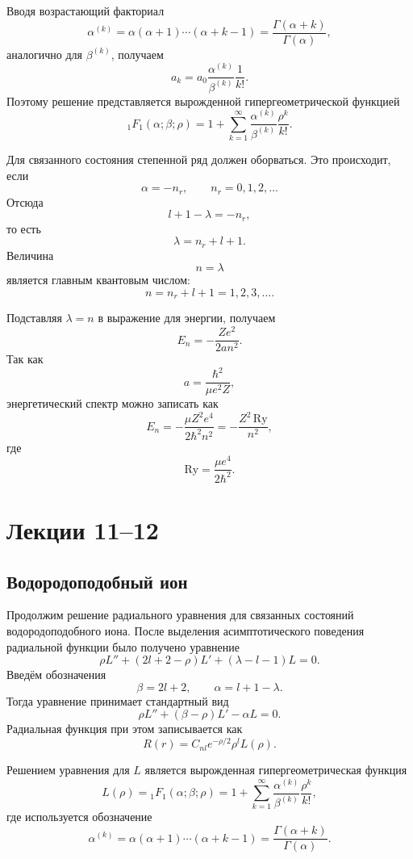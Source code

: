 \documentclass[12pt,a4paper]{article}
\begin{document}
Вводя возрастающий факториал
\[
    \alpha^{(k)}
    =
    \alpha(\alpha+1)\cdots(\alpha+k-1)
    =
    \frac{\Gamma(\alpha+k)}{\Gamma(\alpha)},
\]
аналогично для $\beta^{(k)}$, получаем
\[
    a_k
    =
    a_0
    \frac{\alpha^{(k)}}{\beta^{(k)}}
    \frac{1}{k!}.
\]
Поэтому решение представляется вырожденной гипергеометрической
функцией
\[
    \boxed{
    {}_1F_1(\alpha;\beta;\rho)
    =
    1+
    \sum_{k=1}^{\infty}
    \frac{\alpha^{(k)}}{\beta^{(k)}}
    \frac{\rho^k}{k!}
    }.
\]

Для связанного состояния степенной ряд должен оборваться. Это
происходит, если
\[
    \alpha=-n_r,
    \qquad
    n_r=0,1,2,\ldots
\]
Отсюда
\[
    l+1-\lambda=-n_r,
\]
то есть
\[
    \boxed{
        \lambda=n_r+l+1
    }.
\]
Величина
\[
    n=\lambda
\]
является главным квантовым числом:
\[
    \boxed{
        n=n_r+l+1=1,2,3,\ldots
    }.
\]

Подставляя $\lambda=n$ в выражение для энергии, получаем
\[
    E_n
    =
    -\frac{Ze^2}{2an^2}.
\]
Так как
\[
    a=\frac{\hbar^2}{\mu e^2Z},
\]
энергетический спектр можно записать как
\[
    \boxed{
        E_n
        =
        -\frac{\mu Z^2e^4}{2\hbar^2n^2}
        =
        -\frac{Z^2\,\mathrm{Ry}}{n^2}
    },
\]
где
\[
    \mathrm{Ry}
    =
    \frac{\mu e^4}{2\hbar^2}.
\]

\section{Лекции 11--12}

\subsection{Водородоподобный ион}

Продолжим решение радиального уравнения для связанных состояний
водородоподобного иона. После выделения асимптотического поведения
радиальной функции было получено уравнение
\[
    \rho L''+(2l+2-\rho)L'+(\lambda-l-1)L=0.
\]
Введём обозначения
\[
    \beta=2l+2,
    \qquad
    \alpha=l+1-\lambda.
\]
Тогда уравнение принимает стандартный вид
\[
    \boxed{
        \rho L''+(\beta-\rho)L'-\alpha L=0
    }.
\]
Радиальная функция при этом записывается как
\[
    \boxed{
        R(r)=C_{nl}e^{-\rho/2}\rho^lL(\rho)
    }.
\]

Решением уравнения для $L$ является вырожденная гипергеометрическая
функция
\[
    L(\rho)
    =
    {}_1F_1(\alpha;\beta;\rho)
    =
    1+
    \sum_{k=1}^{\infty}
    \frac{\alpha^{(k)}}{\beta^{(k)}}
    \frac{\rho^k}{k!},
\]
где используется обозначение
\[
    \alpha^{(k)}
    =
    \alpha(\alpha+1)\cdots(\alpha+k-1)
    =
    \frac{\Gamma(\alpha+k)}{\Gamma(\alpha)}.
\]
\end{document}
